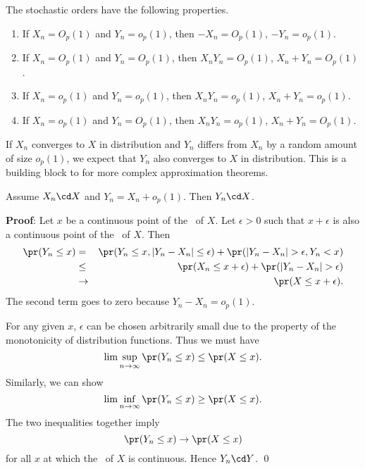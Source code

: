 \begin{lemma}
The stochastic orders have the following properties.
\begin{enumerate}
\item 
If $X_n = O_p(1)$ and $Y_n = o_p(1)$,
then $- X_n = O_p(1)$, $ - Y_n = o_p(1)$.

\item 
If $X_n = O_p(1)$ and $Y_n = O_p(1)$,
then $X_nY_n = O_p(1)$, $X_n + Y_n = O_p(1)$.

\item 
If $X_n = o_p(1)$ and $Y_n = o_p(1)$,
then $X_nY_n = o_p(1)$, $X_n + Y_n = o_p(1)$.

\item 
If $X_n = o_p(1)$ and $Y_n = O_p(1)$,
then $X_nY_n = o_p(1)$, $X_n + Y_n = O_p(1)$.
\end{enumerate}
\end{lemma}
\noindent 

If $X_n$ converges to $X$ in distribution and $Y_n$ differs
from $X_n$ by a random amount of size $o_p(1)$, we expect
that $Y_n$ also converges to $X$ in distribution. This 
is a building block to for more complex approximation theorems.

\begin{lemma}
Assume $X_n \cd X$ and $Y_n = X_n + o_p(1)$. Then $Y_n \cd X$.
\label{lemma11.1}
\end{lemma}
\noindent
{\bf Proof}: 
Let $x$ be a continuous point of the \cdf\ of $X$.
Let $\epsilon> 0$ such that $x+\epsilon$ is also
a continuous point of the \cdf\ of $X$.
Then
\begin{eqnarray*}
\pr(Y_n \leq x) 
&=& 
\pr(Y_n \leq x, |Y_n - X_n | \leq \epsilon)
	+ \pr( |Y_n - X_n| > \epsilon, Y_{n} < x)\\
&\leq & 
\pr(X_n \leq x + \epsilon) + \pr( |Y_n - X_n| > \epsilon)\\
&\to &
\pr(X \leq x + \epsilon).
\end{eqnarray*}
The second term goes to zero because
 $Y_n-X_n= o_p(1)$. 

For any given $x$, $\epsilon$ can be chosen arbitrarily small
due to the property of the monotonicity of distribution functions.
Thus we must have
\[ 
\lim \sup_{n\to \infty} \pr(Y_n \leq x) \leq \pr(X \leq x).
\]
Similarly, we can show
\[ \lim \inf_{n\to \infty} \pr(Y_n \leq x)
\geq \pr(X \leq x).
\]
The two inequalities together imply 
\[
 \pr(Y_n \leq x) \to \pr(X \leq x)
\]
for all $x$ at which the \cdf\ of $X$ is continuous. 
Hence $Y_n \cd Y$. \qed

